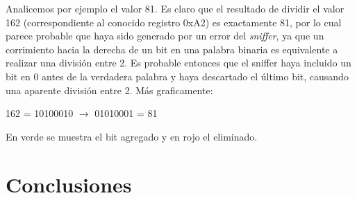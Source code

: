 \documentclass[main]{subfiles}
\begin{document}
Analicemos por ejemplo el valor 81. Es claro que el resultado de dividir el valor 162 (correspondiente al conocido registro 0xA2) es exactamente 81, por lo cual parece probable que haya sido generado por un error del \emph{sniffer}, ya que un corrimiento hacia la derecha de un bit en una palabra binaria es equivalente a realizar una división entre 2. Es probable entonces que el sniffer haya incluido un bit en 0 antes de la verdadera palabra y haya descartado el último bit, causando una aparente división entre 2. Más graficamente:\\

\begin{center} 162 = 10100010 $\rightarrow$ \color{green}0\color{black}1010001\color{red}\color{black} = 81\\
\end{center}

En verde se muestra el bit agregado y en rojo el eliminado.

\section{Conclusiones}
\label{sec:conclu}
\end{document}
